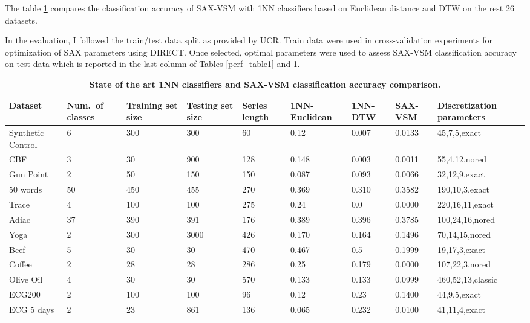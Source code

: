 The table \ref{perf_table2} compares the classification accuracy of SAX-VSM with 
1NN classifiers based on Euclidean distance and DTW on the rest 26 datasets. 

In the evaluation, I followed the train/test data split as provided by UCR. Train data were used 
in cross-validation experiments for optimization of SAX parameters using \mbox{DIRECT}. 
Once selected, optimal parameters were used to assess SAX-VSM classification 
accuracy on test data which is reported in the last column of Tables \ref{perf_table1} 
and \ref{perf_table2}.

\newpage

\begin{table}[t!]
\caption{\bf State of the art 1NN classifiers and SAX-VSM classification accuracy comparison.}
 \label{perf_table2}
\centering
{\setlength{\extrarowheight}{1pt}%
{\scriptsize
\begin{tabularx}{\linewidth}{@{} l *7X @{} l}
\hline
Dataset & \mbox{Num. of} classes & Training set size & Testing set size & Series length & 1NN-Euclidean & 1NN-DTW & SAX-VSM & Discretization parameters \\
\hline
Synthetic Control & 6 & 300 & 300 & 60 & 0.12 & 0.007 & 0.0133 & 45,7,5,exact \\
CBF & 3 & 30 & 900 & 128 & 0.148 & 0.003 & 0.0011 & 55,4,12,nored \\
Gun Point & 2 & 50 & 150 & 150 & 0.087 & 0.093 & 0.0066 & 32,12,9,exact \\
50 words & 50 & 450 & 455 & 270 & 0.369 & 0.310 & 0.3582 & 190,10,3,exact \\ 
Trace & 4 & 100 & 100 & 275 & 0.24 & 0.0 & 0.0000 & 220,16,11,exact \\
Adiac & 37 & 390 & 391 & 176 & 0.389 & 0.396 & 0.3785 & 100,24,16,nored \\
Yoga & 2 & 300 & 3000 & 426 & 0.170 & 0.164 & 0.1496 & 70,14,15,nored \\ 
Beef & 5 & 30 & 30 & 470 & 0.467 & 0.5 & 0.1999 & 19,17,3,exact \\ 
Coffee & 2 & 28 & 28 & 286 & 0.25 & 0.179 & 0.0000 & 107,22,3,nored \\
Olive Oil & 4 & 30 & 30 & 570 & 0.133 & 0.133 & 0.0999 & 460,52,13,classic \\
ECG200 & 2 & 100 & 100 & 96 & 0.12 & 0.23 & 0.1400 & 44,9,5,exact \\
ECG 5 days & 2 & 23 & 861 & 136 & 0.065 & 0.232 & 0.0100 & 41,11,4,exact \\

\end{tabularx}}}
\end{table}
